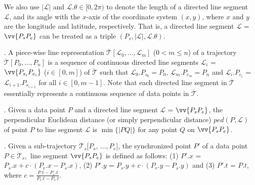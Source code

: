 
We also use $|\mathcal{L}|$ and $\mathcal{L}.\theta\in [0, 2\pi)$ to denote the length of a directed line segment $\mathcal{L}$, and its angle with the $x$-axis of the coordinate system $(x, y)$, where $x$ and $y$ are the longitude and latitude, respectively.
That is, a directed line segment $\mathcal{L}$ = $\vv{P_{s}P_{e}}$ can be treated as a triple $(P_s, |\mathcal{L}|, \mathcal{L}.\theta)$.

. A piece-wise line representation $\overline{\mathcal{T}}[\mathcal{L}_0, \ldots , \mathcal{L}_m]$ ($0< m \le n$) of a trajectory $\dddot{\mathcal{T}}[P_0, \ldots, P_n]$ is a sequence of continuous directed line segments $\mathcal{L}_{i}$ = $\vv{P_{s_i}P_{e_i}}$ ($i\in[0,m]$) of $\dddot{\mathcal{T}}$  such that $\mathcal{L}_{0}.P_{s_0} = P_0$, $\mathcal{L}_{m}.P_{e_m} = P_n$ and  $\mathcal{L}_{i}.P_{e_i}$ = $\mathcal{L}_{i+1}.P_{s_{i+1}}$ for all $i\in[0, m-1]$. Note that each directed line segment in $\overline{\mathcal{T}}$ essentially represents a continuous sequence of data points in $\dddot{\mathcal{T}}$.



. Given a data point $P$ and a directed line segment $\mathcal{L}$ = $\vv{P_{s}P_{e}}$, the perpendicular Euclidean distance (or simply perpendicular distance) $ped(P, \mathcal{L})$ of point $P$ to line segment $\mathcal{L}$ is $\min\{|PQ|\}$ for any point $Q$ on $\vv{P_{s}P_{e}}$.

. Given a sub-trajectory $\dddot{\mathcal{T}}_s[P_s$, $\ldots, P_e]$, the synchronized point $P'$ of a data point  $P \in \dddot{\mathcal{T}}_s$,~\wrt line segment $\vv{P_sP_e}$ is defined as follows:
(1) $P'.x$ = $P_s.x +  c\cdot(P_e.x - P_s.x)$,
(2) $P'.y$ = $P_s.y +  c\cdot(P_e.y - P_s.y)$ and
(3) $P'.t$ = $P.t$, where $c= \frac{P.t-P_s.t}{P_e.t-P_s.t}$.

